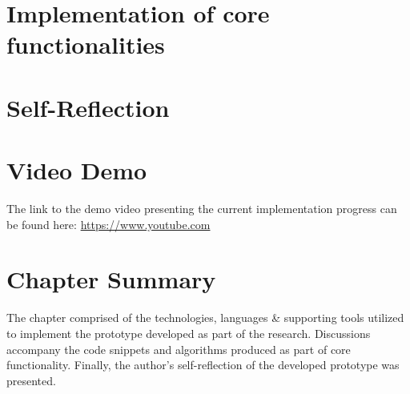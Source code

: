 \section{Implementation of core functionalities}

\section{Self-Reflection}

\section{Video Demo}
The link to the demo video presenting the current implementation progress can be found here: \url{https://www.youtube.com}

\section{Chapter Summary}
The chapter comprised of the technologies, languages \& supporting tools utilized to implement the prototype developed as part of the research. Discussions accompany the code snippets and algorithms produced as part of core functionality. Finally, the author's self-reflection of the developed prototype was presented.

